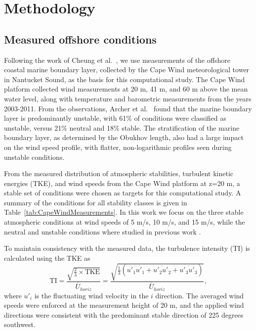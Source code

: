 \section{Methodology}

\subsection{Measured offshore conditions}

Following the work of Cheung et al.~\cite{cheung2020large}, we use
measurements of the offshore coastal marine boundary layer, collected
by the Cape Wind meteorological tower in Nantucket Sound, as the basis
for this computational study.  The Cape Wind platform collected wind
measurements at 20 m, 41 m, and 60 m above the mean water level, along
with temperature and barometric measurements from the years 2003-2011.
From the observations, Archer et al.~\cite{archer2016predominance}
found that the marine boundary layer is predominantly unstable, with
61\% of conditions were classified as unstable, versus 21\% neutral and
18\% stable.  The stratification of the marine boundary layer, as
determined by the Obukhov length, also had a large impact on the wind
speed profile, with flatter, non-logarithmic profiles seen during
unstable conditions.

From the measured distribution of atmospheric stabilities, turbulent
kinetic energies (TKE), and wind speeds from the Cape Wind platform at
z=20 m, a stable set of conditions were chosen as targets for this
computational study.  A summary of the conditions for all stability
classes is given in Table~\ref{tab:CapeWindMeasurements}. In this work we
focus on the three stable atmospheric conditions at wind speeds of
5 m/s, 10 m/s, and 15 m/s, while the neutral and unstable conditions
where studied in previous work \cite{cheung2020large}.

To maintain consistency with the measured data, the turbulence
intensity (TI) is calculated using the TKE as
\begin{equation}
  \textrm{TI} =
  \frac{\sqrt{\frac{2}{3}\times\textrm{TKE}}}{\overline{U}_{horiz}} =
  \frac{\sqrt{\frac{1}{3}\left( \overline{u'_1 u'_1} + \overline{u'_2 u'_2} + \overline{u'_3 u'_3}
      \right)}}{\overline{U}_{horiz}},
\end{equation}
where $u'_i$ is the fluctuating wind velocity in the $i$
direction. The averaged wind speeds were enforced at the measurement
height of 20 m, and the applied wind directions were consistent with
the predominant stable direction of 225 degrees southwest.

